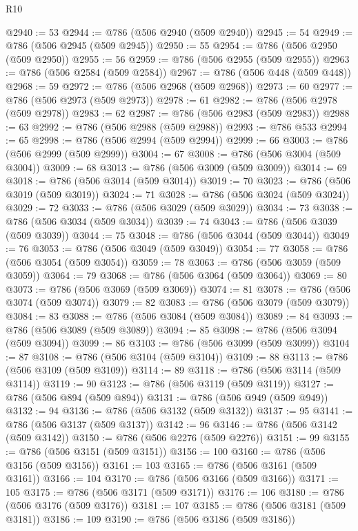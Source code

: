 \begin{lexlean}{R10}
\begin{coremodule}
@2940 := 53
@2944 := @786 (@506 @2940 (@509 @2940))
@2945 := 54
@2949 := @786 (@506 @2945 (@509 @2945))
@2950 := 55
@2954 := @786 (@506 @2950 (@509 @2950))
@2955 := 56
@2959 := @786 (@506 @2955 (@509 @2955))
@2963 := @786 (@506 @2584 (@509 @2584))
@2967 := @786 (@506 @448 (@509 @448))
@2968 := 59
@2972 := @786 (@506 @2968 (@509 @2968))
@2973 := 60
@2977 := @786 (@506 @2973 (@509 @2973))
@2978 := 61
@2982 := @786 (@506 @2978 (@509 @2978))
@2983 := 62
@2987 := @786 (@506 @2983 (@509 @2983))
@2988 := 63
@2992 := @786 (@506 @2988 (@509 @2988))
@2993 := @786 @533
@2994 := 65
@2998 := @786 (@506 @2994 (@509 @2994))
@2999 := 66
@3003 := @786 (@506 @2999 (@509 @2999))
@3004 := 67
@3008 := @786 (@506 @3004 (@509 @3004))
@3009 := 68
@3013 := @786 (@506 @3009 (@509 @3009))
@3014 := 69
@3018 := @786 (@506 @3014 (@509 @3014))
@3019 := 70
@3023 := @786 (@506 @3019 (@509 @3019))
@3024 := 71
@3028 := @786 (@506 @3024 (@509 @3024))
@3029 := 72
@3033 := @786 (@506 @3029 (@509 @3029))
@3034 := 73
@3038 := @786 (@506 @3034 (@509 @3034))
@3039 := 74
@3043 := @786 (@506 @3039 (@509 @3039))
@3044 := 75
@3048 := @786 (@506 @3044 (@509 @3044))
@3049 := 76
@3053 := @786 (@506 @3049 (@509 @3049))
@3054 := 77
@3058 := @786 (@506 @3054 (@509 @3054))
@3059 := 78
@3063 := @786 (@506 @3059 (@509 @3059))
@3064 := 79
@3068 := @786 (@506 @3064 (@509 @3064))
@3069 := 80
@3073 := @786 (@506 @3069 (@509 @3069))
@3074 := 81
@3078 := @786 (@506 @3074 (@509 @3074))
@3079 := 82
@3083 := @786 (@506 @3079 (@509 @3079))
@3084 := 83
@3088 := @786 (@506 @3084 (@509 @3084))
@3089 := 84
@3093 := @786 (@506 @3089 (@509 @3089))
@3094 := 85
@3098 := @786 (@506 @3094 (@509 @3094))
@3099 := 86
@3103 := @786 (@506 @3099 (@509 @3099))
@3104 := 87
@3108 := @786 (@506 @3104 (@509 @3104))
@3109 := 88
@3113 := @786 (@506 @3109 (@509 @3109))
@3114 := 89
@3118 := @786 (@506 @3114 (@509 @3114))
@3119 := 90
@3123 := @786 (@506 @3119 (@509 @3119))
@3127 := @786 (@506 @894 (@509 @894))
@3131 := @786 (@506 @949 (@509 @949))
@3132 := 94
@3136 := @786 (@506 @3132 (@509 @3132))
@3137 := 95
@3141 := @786 (@506 @3137 (@509 @3137))
@3142 := 96
@3146 := @786 (@506 @3142 (@509 @3142))
@3150 := @786 (@506 @2276 (@509 @2276))
@3151 := 99
@3155 := @786 (@506 @3151 (@509 @3151))
@3156 := 100
@3160 := @786 (@506 @3156 (@509 @3156))
@3161 := 103
@3165 := @786 (@506 @3161 (@509 @3161))
@3166 := 104
@3170 := @786 (@506 @3166 (@509 @3166))
@3171 := 105
@3175 := @786 (@506 @3171 (@509 @3171))
@3176 := 106
@3180 := @786 (@506 @3176 (@509 @3176))
@3181 := 107
@3185 := @786 (@506 @3181 (@509 @3181))
@3186 := 109
@3190 := @786 (@506 @3186 (@509 @3186))

\end{coremodule}
\end{lexlean}
